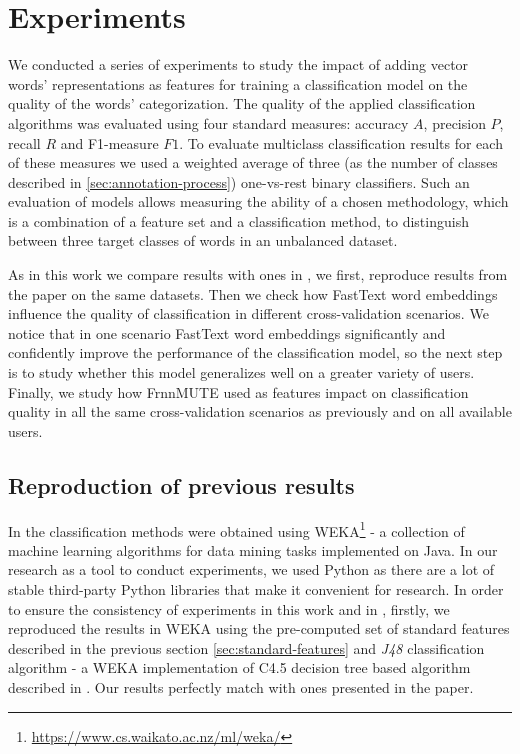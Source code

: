 \chapter{Experiments}
\label{ch:experiments}

We conducted a series of experiments to study the impact of adding vector words' representations as features for training a classification model on the quality of the words' categorization. The quality of the applied classification algorithms was evaluated using four standard measures: accuracy $A$, precision $P$, recall $R$ and F1-measure $F1$. To evaluate multiclass classification results for each of these measures we used a weighted average of three (as the number of classes described in \ref{sec:annotation-process}) one-vs-rest binary classifiers. Such an evaluation of models allows measuring the ability of a chosen methodology, which is a combination of a feature set and a classification method, to distinguish between three target classes of words in an unbalanced dataset. 

As in this work we compare results with ones in \cite{Grabar-PITR2014}, we first, reproduce results from the paper on the same datasets. Then we check how FastText word embeddings influence the quality of classification in different cross-validation scenarios. We notice that in one scenario FastText word embeddings significantly and confidently improve the performance of the classification model, so the next step is to study whether this model generalizes well on a greater variety of users. Finally, we study how FrnnMUTE used as features impact on classification quality in all the same cross-validation scenarios as previously and on all available users.

\section{Reproduction of previous results}

In \citep{Grabar-PITR2014} the classification methods were obtained using WEKA\footnote{\url{https://www.cs.waikato.ac.nz/ml/weka/}} - a collection of machine learning algorithms for data mining tasks implemented on Java. In our research as a tool to conduct experiments, we used Python as there are a lot of stable third-party Python libraries that make it convenient for research. In order to ensure the consistency of experiments in this work and in \citep{Grabar-PITR2014}, firstly, we reproduced the results in WEKA using the pre-computed set of standard features described in the previous section \ref{sec:standard-features} and \textit{J48} classification algorithm - a WEKA implementation of C4.5 decision tree based algorithm described in \cite{Quinlan1993}. Our results perfectly match with ones presented in the paper. 

